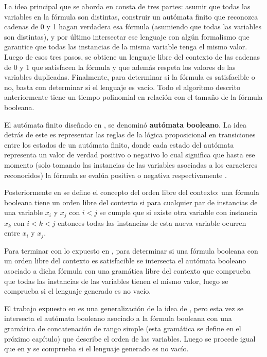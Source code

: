 La idea principal que se aborda en \cite{aCFSAT} consta de tres partes: asumir que todas las variables en 
la fórmula son distintas, construir un autómata finito que reconozca cadenas de 0 y 1 hagan verdadera esa 
fórmula (asumiendo que todas las variables son distintas), y por último intersectar ese lenguaje con algún 
formalismo que garantice que todas las instancias de la misma variable tenga el mismo valor. Luego de esos 
tres pasos, se obtiene un lenguaje libre del contexto de las cadenas de 0 y 1 que satisfacen la fórmula y 
que además respeta los valores de las variables duplicadas.  Finalmente, para determinar si la fórmula es 
satisfacible o no, basta con determinar si el lenguaje es vacío. Todo el algoritmo descrito anteriormente tiene un tiempo polinomial en relación con el 
tamaño de la fórmula booleana.

El autómata finito diseñado en \cite{aCFSAT}, se denominó \textbf{autómata booleano}. La idea detrás de este es representar 
las reglas de la lógica proposicional en transiciones entre los estados de un autómata finito, donde cada estado del autómata representa un valor de verdad positivo o 
negativo lo cual significa que hasta ese momento (solo tomando las instancias de las variables asociadas a los 
caracteres reconocidos) la fórmula se evalúa positiva o negativa respectivamente \cite{aCFSAT}.

Posteriormente en \cite{aCFSAT} se define el concepto del orden libre del contexto: una fórmula booleana tiene un orden libre del contexto si para cualquier par de instancias de una variable $x_i$ y $x_j$ con $i<j$ se
cumple que si existe otra variable con instancia $x_k$ con $i<k<j$ entonces todas las instancias de esta nueva
variable ocurren entre $x_i$ y $x_j$.

Para terminar con lo expuesto en \cite{aCFSAT}, para determinar si una fórmula booleana con un orden libre del contexto 
es satisfacible se intersecta el autómata booleano asociado a dicha fórmula con una gramática libre del contexto 
que comprueba que todas las instancias de las variables tienen el mismo valor, luego se comprueba si el lenguaje
generado es no vacío.

El trabajo expuesto en \cite{aSRCSAT} es una generalización de la idea de \cite{aCFSAT}, pero esta vez se intersecta
el autómata booleano asociado a la fórmula booleana con una gramática de concatenación de rango simple (esta gramática
se define en el próximo capítulo) que describe el orden de las variables. Luego se procede igual que en \cite{aCFSAT}
y se comprueba si el lenguaje generado es no vacío.

